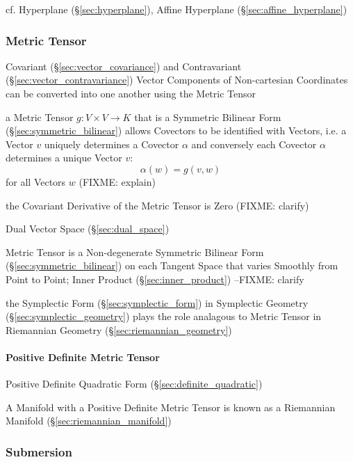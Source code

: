 cf. Hyperplane (\S\ref{sec:hyperplane}), Affine Hyperplane
(\S\ref{sec:affine_hyperplane})



\subsubsection{Metric Tensor}\label{sec:metric_tensor}

Covariant (\S\ref{sec:vector_covariance}) and Contravariant
(\S\ref{sec:vector_contravariance}) Vector Components of Non-cartesian
Coordinates can be converted into one another using the Metric Tensor

a Metric Tensor $g : V \times V \rightarrow K$ that is a Symmetric Bilinear Form
(\S\ref{sec:symmetric_bilinear}) allows Covectors to be identified with Vectors,
i.e. a Vector $v$ uniquely determines a Covector $\alpha$ and conversely each
Covector $\alpha$ determines a unique Vector $v$:
\[
  \alpha (w) = g (v,w)
\]
for all Vectors $w$
(FIXME: explain)

the Covariant Derivative of the Metric Tensor is Zero (FIXME: clarify)

Dual Vector Space (\S\ref{sec:dual_space})

Metric Tensor is a Non-degenerate Symmetric Bilinear Form
(\S\ref{sec:symmetric_bilinear}) on each Tangent Space that varies Smoothly from
Point to Point; Inner Product (\S\ref{sec:inner_product}) --FIXME: clarify

the Symplectic Form (\S\ref{sec:symplectic_form}) in Symplectic Geometry
(\S\ref{sec:symplectic_geometry}) plays the role analagous to Metric Tensor in
Riemannian Geometry (\S\ref{sec:riemannian_geometry})



\paragraph{Positive Definite Metric Tensor}
\label{sec:positive_definite_metric_tensor}\hfill

Positive Definite Quadratic Form (\S\ref{sec:definite_quadratic})

A Manifold with a Positive Definite Metric Tensor is known as a
Riemannian Manifold (\S\ref{sec:riemannian_manifold})



\subsubsection{Submersion}\label{sec:submersion}

